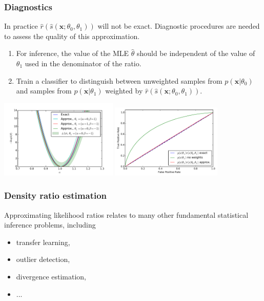 \documentclass{beamer}
\begin{document}
\begin{frame}
    \frametitle{Diagnostics}

    In practice $\hat{r}(\hat{s}(\mathbf{x}; \theta_0, \theta_1))$ will not be exact.  Diagnostic procedures are needed to assess the quality of this approximation.

    \begin{enumerate}
        \item For inference, the value of the MLE $\hat{\theta}$ should be independent of the value of $\theta_1$ used in the denominator of the ratio.
        \item Train a classifier to distinguish between unweighted samples from $p(\mathbf{x}|\theta_0)$ and samples from $p(\mathbf{x}|\theta_1)$ weighted by $\hat{r}(\hat{s}(\mathbf{x}; \theta_0, \theta_1))$.
    \end{enumerate}

    \vspace{-2em}

    \begin{center}
            \includegraphics[clip, trim=0.3cm 0.3cm 0.3cm 0.3cm,height=10.075em]{figures/likelihood_comp_2.pdf}
            \includegraphics[clip, trim=0.3cm 0.3cm 0.3cm 0.3cm,height=9.5em]{figures/ROC_comp2.pdf}
    \end{center}

\end{frame}

\begin{frame}
    \frametitle{Density ratio estimation}

    Approximating likelihood ratios relates to many other fundamental statistical inference problems, including

    \begin{itemize}
        \item transfer learning,
        \item outlier detection,
        \item divergence estimation,
        \item ...
    \end{itemize}
\end{frame}
\end{document}
